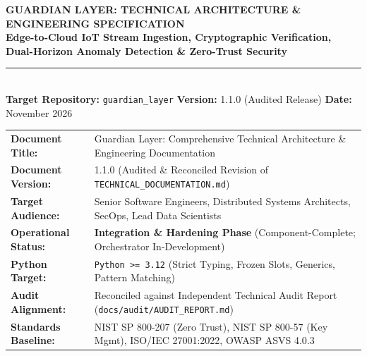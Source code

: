 \documentclass[10pt,a4paper]{report}
\begin{document}
\begin{titlepage}
\begin{center}
\vspace*{0.8cm}
{\huge \textbf{\textsf{GUARDIAN LAYER: TECHNICAL ARCHITECTURE \& ENGINEERING SPECIFICATION}}}\\[0.5cm]
{\Large \textbf{\textsf{Edge-to-Cloud IoT Stream Ingestion, Cryptographic Verification, Dual-Horizon Anomaly Detection \& Zero-Trust Security}}}\\[0.4cm]
\rule{\linewidth}{1.5pt}\\[0.4cm]
{\large \textsf{\textbf{Target Repository:} \texttt{guardian\_layer} \quad \textbar \quad \textbf{Version:} 1.1.0 (Audited Release) \quad \textbar \quad \textbf{Date:} November 2026}}\\[0.8cm]

\begin{tcolorbox}[colback=blue!5!white,colframe=blue!75!black,title=\textbf{System Specification \& Operational Metadata},arc=2mm]
\begin{tabularx}{\textwidth}{lX}
\textbf{Document Title:} & Guardian Layer: Comprehensive Technical Architecture \& Engineering Documentation \\
\textbf{Document Version:} & 1.1.0 (Audited \& Reconciled Revision of \texttt{TECHNICAL\_DOCUMENTATION.md}) \\
\textbf{Target Audience:} & Senior Software Engineers, Distributed Systems Architects, SecOps, Lead Data Scientists \\
\textbf{Operational Status:} & \textbf{Integration \& Hardening Phase} (Component-Complete; Orchestrator In-Development) \\
\textbf{Python Target:} & \texttt{Python >= 3.12} (Strict Typing, Frozen Slots, Generics, Pattern Matching) \\
\textbf{Audit Alignment:} & Reconciled against Independent Technical Audit Report (\texttt{docs/audit/AUDIT\_REPORT.md}) \\
\textbf{Standards Baseline:} & NIST SP 800-207 (Zero Trust), NIST SP 800-57 (Key Mgmt), ISO/IEC 27001:2022, OWASP ASVS 4.0.3 \\
\end{tabularx}
\end{tcolorbox}

\vfill


\end{center}
\end{titlepage}
\end{document}
